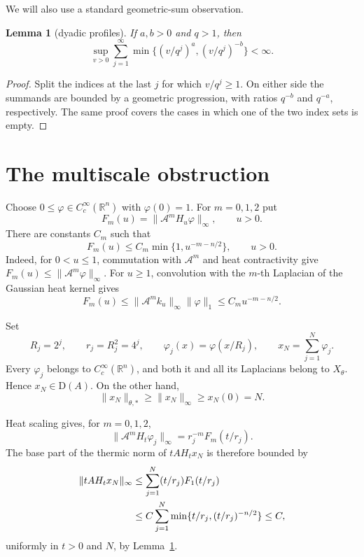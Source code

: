 \documentclass[11pt]{article}
\newtheorem{lemma}[theorem]{Lemma}
\newcommand{\R}{\mathbb R}
\newcommand{\cA}{\mathcal A}
\newcommand{\D}{\mathrm D}
\begin{document}
We will also use a standard geometric-sum observation.

\begin{lemma}[dyadic profiles]\label{lem:dyadic}
If $a,b>0$ and $q>1$, then
\[
 \sup_{v>0}\sum_{j=1}^\infty
 \min\bigl\{(v/q^j)^a,(v/q^j)^{-b}\bigr\}<\infty.
\]
\end{lemma}

\begin{proof}
Split the indices at the last $j$ for which $v/q^j\geq1$.  On either side
the summands are bounded by a geometric progression, with ratios $q^{-b}$
and $q^{-a}$, respectively.  The same proof covers the cases in which one of
the two index sets is empty.
\end{proof}

\section{The multiscale obstruction}

Choose $0\leq\varphi\in C_c^\infty(\R^n)$ with $\varphi(0)=1$.  For
$m=0,1,2$ put
\[
 F_m(u)=\|\cA^mH_u\varphi\|_\infty,\qquad u>0.
\]
There are constants $C_m$ such that
\begin{equation}\label{eq:heatprofile}
 F_m(u)\leq C_m\min\{1,u^{-m-n/2}\},\qquad u>0.
\end{equation}
Indeed, for $0<u\leq1$, commutation with $\cA^m$ and heat contractivity give
$F_m(u)\leq\|\cA^m\varphi\|_\infty$.  For $u\geq1$, convolution with the
$m$-th Laplacian of the Gaussian heat kernel gives
\[
 F_m(u)\leq\|\cA^m k_u\|_\infty\|\varphi\|_1
 \leq C_m u^{-m-n/2}.
\]

Set
\[
 R_j=2^j,\qquad r_j=R_j^2=4^j,\qquad
 \varphi_j(x)=\varphi(x/R_j),\qquad
 x_N=\sum_{j=1}^N\varphi_j.
\]
Every $\varphi_j$ belongs to $C_c^\infty(\R^n)$, and both it and all its
Laplacians belong to $X_\theta$.  Hence $x_N\in\D(A)$.  On the other hand,
\begin{equation}\label{eq:lower}
 \|x_N\|_{\theta,*}\geq\|x_N\|_\infty
 \geq x_N(0)=N.
\end{equation}

Heat scaling gives, for $m=0,1,2$,
\begin{equation}\label{eq:scaling}
 \|\cA^mH_t\varphi_j\|_\infty
 =r_j^{-m}F_m(t/r_j).
\end{equation}
The base part of the thermic norm of $tAH_tx_N$ is therefore bounded by
\begin{align}
 \|tAH_tx_N\|_\infty
 &\leq\sum_{j=1}^N (t/r_j)F_1(t/r_j)\notag\\
 &\leq C\sum_{j=1}^N
 \min\{t/r_j,(t/r_j)^{-n/2}\}\leq C,             \label{eq:base}
\end{align}
uniformly in $t>0$ and $N$, by Lemma~\ref{lem:dyadic}.
\end{document}
